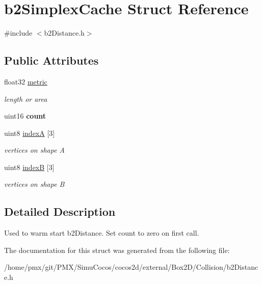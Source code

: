 \hypertarget{structb2SimplexCache}{}\section{b2\+Simplex\+Cache Struct Reference}
\label{structb2SimplexCache}


{\ttfamily \#include $<$b2\+Distance.\+h$>$}

\subsection*{Public Attributes}
\begin{DoxyCompactItemize}
\item 
\mbox{\label{structb2SimplexCache_a018e0a500b417d79bfed3f21310b15a2}} 
float32 \hyperlink{structb2SimplexCache_a018e0a500b417d79bfed3f21310b15a2}{metric}
\begin{DoxyCompactList}\small\item\em length or area \end{DoxyCompactList}\item 
\mbox{\label{structb2SimplexCache_a5ef63839988cc06210ae76bcef96f56c}} 
uint16 {\bfseries count}
\item 
\mbox{\label{structb2SimplexCache_ac913b871b81fd3b4ace7ca094e608420}} 
uint8 \hyperlink{structb2SimplexCache_ac913b871b81fd3b4ace7ca094e608420}{indexA} \mbox{[}3\mbox{]}
\begin{DoxyCompactList}\small\item\em vertices on shape A \end{DoxyCompactList}\item 
\mbox{\label{structb2SimplexCache_acaa803c4ce1605ab804bb7ac98d4670d}} 
uint8 \hyperlink{structb2SimplexCache_acaa803c4ce1605ab804bb7ac98d4670d}{indexB} \mbox{[}3\mbox{]}
\begin{DoxyCompactList}\small\item\em vertices on shape B \end{DoxyCompactList}\end{DoxyCompactItemize}


\subsection{Detailed Description}
Used to warm start b2\+Distance. Set count to zero on first call. 

The documentation for this struct was generated from the following file\+:\begin{DoxyCompactItemize}
\item 
/home/pmx/git/\+P\+M\+X/\+Simu\+Cocos/cocos2d/external/\+Box2\+D/\+Collision/b2\+Distance.\+h\end{DoxyCompactItemize}
